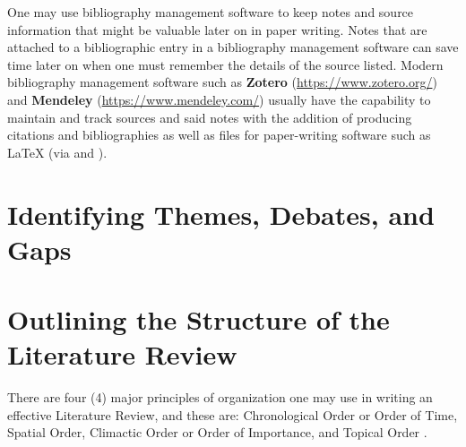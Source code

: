 \documentclass{strrespaper-trad}
\begin{document}
			One may use bibliography management software to keep notes and source information that might be valuable later on in paper writing.
			Notes that are attached to a bibliographic entry in a bibliography management software can save time later on when one must remember the details of the source listed.
			Modern bibliography management software such as \textbf{Zotero} (\url{https://www.zotero.org/}) and \textbf{Mendeley} (\url{https://www.mendeley.com/}) usually have the capability to maintain and track sources and said notes with the addition of producing citations and bibliographies as well as files for paper-writing software such as \LaTeX{} (via \BibTeX{} and \BibLaTeX{}).

		\section*{Identifying Themes, Debates, and Gaps}

		\section*{Outlining the Structure of the Literature Review}
			There are four (4) major principles of organization one may use in writing an effective Literature Review, and these are: Chronological Order or Order of Time, Spatial Order, Climactic Order or Order of Importance, and Topical Order \autocite{friedlanderPrinciplesOrganization2004}.
\end{document}
